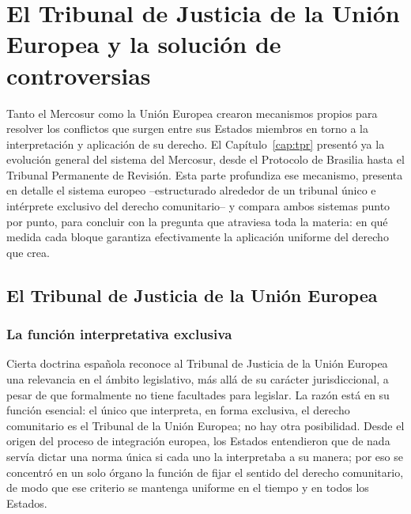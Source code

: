 \documentclass[12pt,oneside]{book}
\renewcommand{\chaptermark}[1]{\markboth{\thechapter.\ #1}{}}
\begin{document}
\part{El Tribunal de Justicia de la Unión Europea y la solución de controversias}

Tanto el Mercosur como la Unión Europea crearon mecanismos propios para resolver los conflictos que surgen entre sus Estados miembros en torno a la interpretación y aplicación de su derecho. El Capítulo~\ref{cap:tpr} presentó ya la evolución general del sistema del Mercosur, desde el Protocolo de Brasilia hasta el Tribunal Permanente de Revisión. Esta parte profundiza ese mecanismo, presenta en detalle el sistema europeo --estructurado alrededor de un tribunal único e intérprete exclusivo del derecho comunitario-- y compara ambos sistemas punto por punto, para concluir con la pregunta que atraviesa toda la materia: en qué medida cada bloque garantiza efectivamente la aplicación uniforme del derecho que crea.

\chapter{El Tribunal de Justicia de la Unión Europea}
\chaptermark{El Tribunal de Justicia de la UE}
\label{cap:tjue}

\section{La función interpretativa exclusiva}

Cierta doctrina española reconoce al Tribunal de Justicia de la Unión Europea una relevancia en el ámbito legislativo, más allá de su carácter jurisdiccional, a pesar de que formalmente no tiene facultades para legislar. La razón está en su función esencial: el único que interpreta, en forma exclusiva, el derecho comunitario es el Tribunal de la Unión Europea; no hay otra posibilidad. Desde el origen del proceso de integración europea, los Estados entendieron que de nada servía dictar una norma única si cada uno la interpretaba a su manera; por eso se concentró en un solo órgano la función de fijar el sentido del derecho comunitario, de modo que ese criterio se mantenga uniforme en el tiempo y en todos los Estados.
\end{document}

